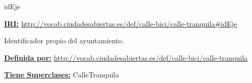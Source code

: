 \begin{mybox}{idEje}
\begin{flushleft}
\underline{\textbf{IRI:}}
\url{http://vocab.ciudadesabiertas.es/def/calle-bici/calle-tranquila#idEje}
\newline

Identificador propio del ayuntamiento. 
\newline


\underline{\textbf{Definida por:}}
\url{http://vocab.ciudadesabiertas.es/def/calle-bici/calle-tranquila}
\newline

\underline{\textbf{Tiene Superclases:}}
\newline CalleTranquila

\end{flushleft}
\end{mybox}









